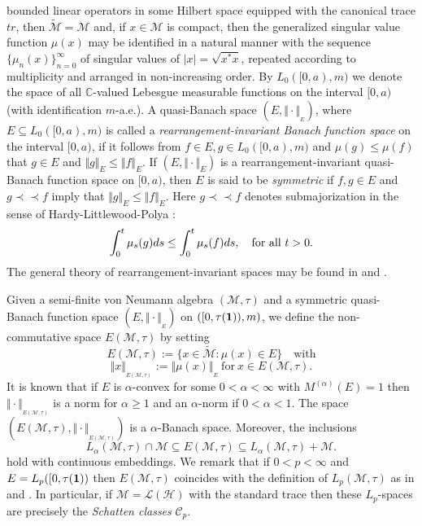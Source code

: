 \documentclass[12pt]{amsart}
\let\cal\mathcal
\def\m{{\cal M}}
\def\p{\prec\prec}
\def\nmt{\widetilde {\cal M}}
\def\nm{{\cal M}}
\numberwithin{equation}{section}
\numberwithin{theorem}{section}
\begin{document}
bounded linear operators in some Hilbert space equipped with
the canonical trace $tr$, then $\nmt =\nm$ and, if $x\in \nm$
is compact, then the generalized singular value function $\mu (x)$
may be identified in a natural manner with the sequence
$\{\mu _n(x)\}_{n=0}^\infty$ of singular values of
$\vert x\vert =\sqrt {x^*x}$, repeated according to
multiplicity and arranged in non-increasing order.
\smallskip
\noindent  By $L_0([0, a),m)$ we denote the
space of all ${\mathbb C}$-valued Lebesgue measurable functions on the
interval $[0,a )$
(with identification $m$-a.e.).
 A quasi-Banach space $(E,\Vert \cdot
\Vert_{_E})$, where $E\subseteq L_0([0,a),m)$ is called a {\it
rearrangement-invariant Banach function space} on the interval
$[0,a)$, if it follows from $f\in
E, g\in L_0([0,a),m)$ and $\mu(g)\leq\mu (f)$ that $g\in E$
and $\Vert g\Vert_E\leq \Vert f\Vert_E$. If $(E,\Vert\cdot\Vert_E)$
is a rearrangement-invariant  quasi-Banach function space on $[0,a)$,
then $E$ is said to be {\it symmetric }
if $f,g\in E$ and $g\p f$ imply
that $\Vert g\Vert_E\leq\Vert f\Vert_E$.
 Here $g\p f$ denotes submajorization in the sense of
 Hardy-Littlewood-Polya :
$$
\int^t_0 \mu_s(g) ds \leq  \int^t_0 \mu_s(f) ds,
\quad {\rm for \ all}\ t>0.
$$
The general theory of rearrangement-invariant spaces may
be found in \cite{LT} and \cite{SA}.


\noindent Given a semi-finite von Neumann algebra $(\nm,\tau)$
and a symmetric quasi-Banach function space
$(E,\Vert \cdot \Vert _{_{E}})$ on $([0,\tau ({\bf 1})),m)$,
we define the non-commutative space $E(\nm,\tau)$ by setting
$$E(\nm,\tau):=\{x\in \nmt: \mu (x)\in E\}\quad \text{with}$$
$$\Vert x\Vert _{_{E(\nm,\tau)}}:=\Vert \mu(x)\Vert _{_{E}}\ 
\text{for}\ x \in E(\nm,\tau).$$
It is known that if $E$ is $\alpha$-convex  for some $0<\alpha<\infty$
with $M^{(\alpha)}(E)=1$ then $\Vert \cdot \Vert _{_{E(\m,\tau)}}$
is a norm for $\alpha \geq 1$ and an $\alpha$-norm  if
$0<\alpha<1$. 
 The space 
$(E(\nm,\tau), \Vert \cdot \Vert _{_{E(\nm,\tau)}})$ is a $\alpha$-Banach
space.
 Moreover,  the inclusions
$$
 L_\alpha({\cal M}, \tau ) \cap {\cal M}
 \subseteq E ({\cal M}, \tau )
 \subseteq L_\alpha({\cal M}, \tau ) + {\cal M}.
$$
hold with continuous embeddings. 
 We remark that if 
$0<p<\infty$ and 
$E=L_p([0,\tau({\bf 1}))$ then $E(\cal M, \tau)$ coincides with the definition
of $L_p(\cal M,\tau)$ as in \cite{N} and \cite{Te}. In particular, if
$\m =\cal{L}(\cal H)$ with the standard trace then these
 $L_p$-spaces are precisely the {\it Schatten classes} $\cal C_p$.
\end{document}
